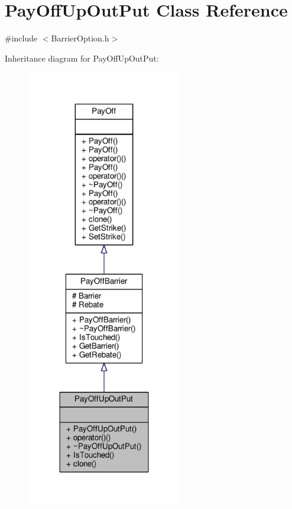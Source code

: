 \hypertarget{classPayOffUpOutPut}{}\section{Pay\+Off\+Up\+Out\+Put Class Reference}
\label{classPayOffUpOutPut}


{\ttfamily \#include $<$Barrier\+Option.\+h$>$}



Inheritance diagram for Pay\+Off\+Up\+Out\+Put\+:
\nopagebreak
\begin{figure}[H]
\begin{center}
\leavevmode
\includegraphics[width=192pt]{classPayOffUpOutPut__inherit__graph}
\end{center}
\end{figure}


